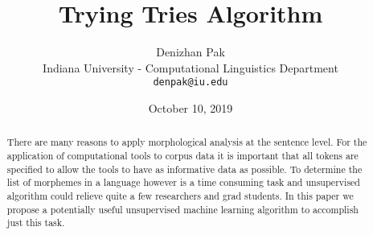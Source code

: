 \documentclass[11pt,a4paper]{article}
\title{Trying Tries Algorithm}
\author{Denizhan Pak \\ Indiana University - Computational
       Linguistics Department\\ {\tt denpak@iu.edu}}
\date{October 10, 2019}
\begin{document}
\maketitle
\begin{abstract}
        There are many reasons to apply morphological analysis at the 
        sentence level. For the application of computational tools to 
        corpus data it is important that all tokens are specified to 
        allow the tools to have as informative data as possible.
        To determine the list of morphemes in a language however is a time
        consuming task and unsupervised algorithm could relieve quite a few
        researchers and grad students. In this paper we propose a 
        potentially useful unsupervised machine learning algorithm to 
        accomplish just this task.
\end{abstract}
\end{document}
